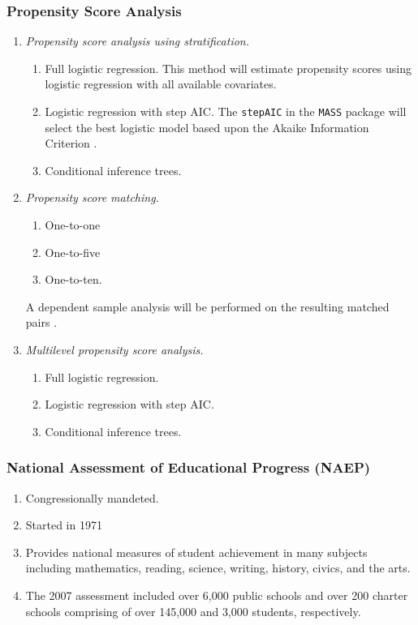 \documentclass[10pt,slidestop,mathserif]{beamer}
\begin{document}
\begin{frame}
	\frametitle{Propensity Score Analysis}
	\begin{enumerate}
		\item \textit{Propensity score analysis using stratification.}
		\begin{enumerate}
			\item Full logistic regression. This method will estimate propensity scores using logistic regression with all available covariates.
			\item Logistic regression with step AIC. The \texttt{stepAIC} in the \texttt{MASS} package \cite{mass} will select the best logistic model based upon the Akaike Information Criterion \cite{Akaike1974}. 
			\item Conditional inference trees.
		\end{enumerate}
	\pause
	\item \textit{Propensity score matching.} 
		\begin{enumerate}
			\item One-to-one
			\item One-to-five
			\item One-to-ten.
		\end{enumerate}
		A dependent sample analysis will be performed on the resulting matched pairs \cite{Austin2011}.
	\pause
	\item \textit{Multilevel propensity score analysis.}
		\begin{enumerate}
			\item Full logistic regression.
			\item Logistic regression with step AIC.
			\item Conditional inference trees.
		\end{enumerate}
	\end{enumerate}
\end{frame}

\begin{frame}[c]
	\frametitle{National Assessment of Educational Progress (NAEP)}
	\begin{enumerate}
	\item Congressionally mandeted.
	\item Started in 1971
	\item Provides national measures of student achievement in many subjects including mathematics, reading, science, writing, history, civics, and the arts. 
	\item The 2007 assessment included over 6,000 public schools and over 200 charter schools comprising of over 145,000 and 3,000 students, respectively. 
	\end{enumerate}
\end{frame}
\end{document}
